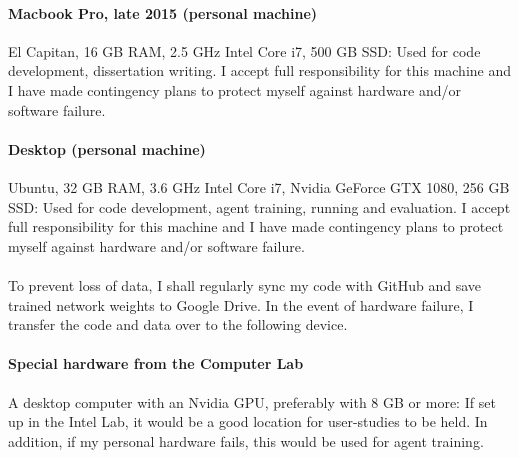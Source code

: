 \documentclass[a4paper]{article}
\begin{document}
\paragraph{Macbook Pro, late 2015 (personal machine)} El Capitan, 16 GB RAM, 2.5 GHz Intel Core i7, 500 GB SSD: Used for code development, dissertation writing. I accept full responsibility for this machine and I have made contingency plans to protect myself against hardware and/or software failure.

\paragraph{Desktop (personal machine)} Ubuntu, 32 GB RAM, 3.6 GHz Intel Core i7, Nvidia GeForce GTX 1080, 256 GB SSD: Used for code development, agent training, running and evaluation. I accept full responsibility for this machine and I have made contingency plans to protect myself against hardware and/or software failure.

\paragraph{}To prevent loss of data, I shall regularly sync my code with GitHub and save trained network weights to Google Drive. In the event of hardware failure, I transfer the code and data over to the following device.

\paragraph{Special hardware from the Computer Lab} A desktop computer with an Nvidia GPU, preferably with 8 GB or more: If set up in the Intel Lab, it would be a good location for user-studies to be held. In addition, if my personal hardware fails, this would be used for agent training.

\pagebreak

 

\end{document}
